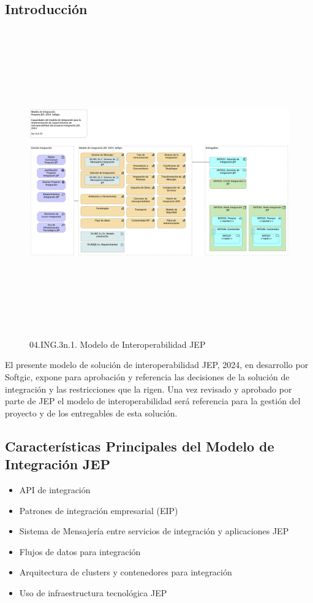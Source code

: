 \documentclass[
  paper=a4,
  ,captions=tableheading
]{scrartcl}
\providecommand{\tightlist}{%
  \setlength{\itemsep}{0pt}\setlength{\parskip}{0pt}}
\begin{document}
\subsection{Introducción}\label{sec:introducciuxf3n}

\begin{figure}
\centering
\includegraphics[width=\textwidth,height=5.20833in]{03.1n.modelointegrac.png}
\caption{04.ING.3n.1. Modelo de Interoperabilidad JEP}
\end{figure}

El presente modelo de solución de interoperabilidad JEP, 2024, en
desarrollo por Softgic, expone para aprobación y referencia las
decisiones de la solución de integración y las restricciones que la
rigen. Una vez revisado y aprobado por parte de JEP el modelo de
interoperabilidad será referencia para la gestión del proyecto y de los
entregables de esta solución.

\subsection{Características Principales del Modelo de Integración
JEP}\label{sec:caracteruxedsticas-principales-del-modelo-de-integraciuxf3n-jep}

\begin{itemize}
\tightlist
\item
  API de integración
\item
  Patrones de integración empresarial (EIP)
\item
  Sistema de Mensajería entre servicios de integración y aplicaciones
  JEP
\item
  Flujos de datos para integración
\item
  Arquitectura de clusters y contenedores para integración
\item
  Uso de infraestructura tecnológica JEP
\end{itemize}
\end{document}
